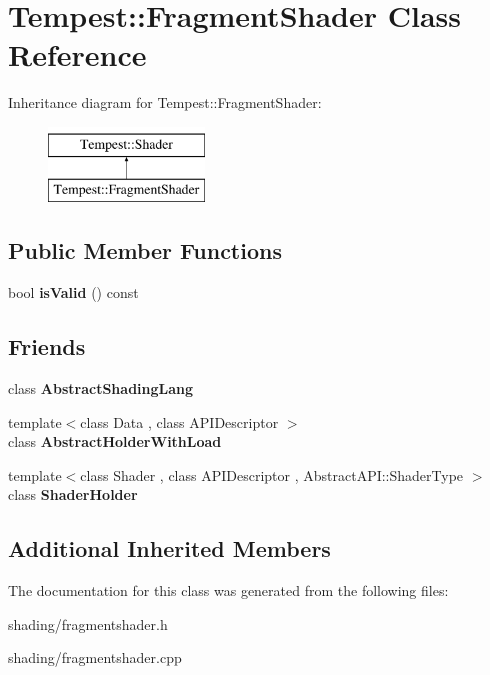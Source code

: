 \hypertarget{class_tempest_1_1_fragment_shader}{\section{Tempest\+:\+:Fragment\+Shader Class Reference}
\label{class_tempest_1_1_fragment_shader}
}
Inheritance diagram for Tempest\+:\+:Fragment\+Shader\+:\begin{figure}[H]
\begin{center}
\leavevmode
\includegraphics[height=2.000000cm]{class_tempest_1_1_fragment_shader}
\end{center}
\end{figure}
\subsection*{Public Member Functions}
\begin{DoxyCompactItemize}
\item 
\hypertarget{class_tempest_1_1_fragment_shader_a7d009bb0e9a0b40f1a563c22e45ea448}{bool {\bfseries is\+Valid} () const }\label{class_tempest_1_1_fragment_shader_a7d009bb0e9a0b40f1a563c22e45ea448}

\end{DoxyCompactItemize}
\subsection*{Friends}
\begin{DoxyCompactItemize}
\item 
\hypertarget{class_tempest_1_1_fragment_shader_aae7a40a130def4c19f2b818dc9c51de2}{class {\bfseries Abstract\+Shading\+Lang}}\label{class_tempest_1_1_fragment_shader_aae7a40a130def4c19f2b818dc9c51de2}

\item 
\hypertarget{class_tempest_1_1_fragment_shader_ad2e2e5798093053ccfa5c8bebc2e621f}{{\footnotesize template$<$class Data , class A\+P\+I\+Descriptor $>$ }\\class {\bfseries Abstract\+Holder\+With\+Load}}\label{class_tempest_1_1_fragment_shader_ad2e2e5798093053ccfa5c8bebc2e621f}

\item 
\hypertarget{class_tempest_1_1_fragment_shader_a9478041b9d4218bb2c32ad6faa058c73}{{\footnotesize template$<$class Shader , class A\+P\+I\+Descriptor , Abstract\+A\+P\+I\+::\+Shader\+Type $>$ }\\class {\bfseries Shader\+Holder}}\label{class_tempest_1_1_fragment_shader_a9478041b9d4218bb2c32ad6faa058c73}

\end{DoxyCompactItemize}
\subsection*{Additional Inherited Members}


The documentation for this class was generated from the following files\+:\begin{DoxyCompactItemize}
\item 
shading/fragmentshader.\+h\item 
shading/fragmentshader.\+cpp\end{DoxyCompactItemize}
